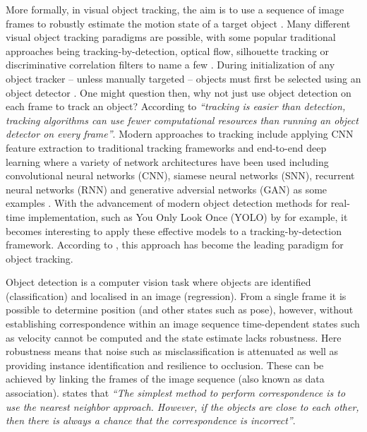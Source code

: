 \documentclass[a4paper,twoside,12pt]{report}
\begin{document}
More formally, in visual object tracking, the aim is to use a sequence of image frames to robustly estimate the motion state of a target object \citep{track1}. Many different visual object tracking paradigms are possible, with some popular traditional approaches being tracking-by-detection, optical flow, silhouette tracking or discriminative correlation filters to name a few \citep{track0}. During initialization of any object tracker -- unless manually targeted -- objects must first be selected using an object detector \citep{tradtrack0}. One might question then, why not just use object detection on each frame to track an object? According to \cite{tradtrack5} \textit{``tracking is easier than detection, tracking algorithms can use fewer computational resources than running an object detector on every frame''}. Modern approaches to tracking include applying CNN feature extraction to traditional tracking frameworks and end-to-end deep learning where a variety of network architectures have been used including convolutional neural networks (CNN), siamese neural networks (SNN), recurrent neural networks (RNN) and generative adversial networks (GAN) as some examples \citep{deeptrack1}. With the advancement of modern object detection methods for real-time implementation, such as You Only Look Once (YOLO) by \cite{yolo} for example, it becomes interesting to apply these effective models to a tracking-by-detection framework. According to \cite{deepsort}, this approach has become the leading paradigm for object tracking.

Object detection is a computer vision task where objects are identified (classification) and localised in an image (regression). From a single frame it is possible to determine position (and other states such as pose), however, without establishing correspondence within an image sequence time-dependent states such as velocity cannot be computed and the state estimate lacks robustness. Here robustness means that noise such as misclassification is attenuated as well as providing instance identification and resilience to occlusion. These can be achieved by linking the frames of the image sequence (also known as data association). \cite{tradtrack0} states that \textit{``The simplest method to perform correspondence is to use the nearest neighbor approach. However, if the objects are close to each other, then there is always a chance that the correspondence is incorrect''}.
\end{document}

